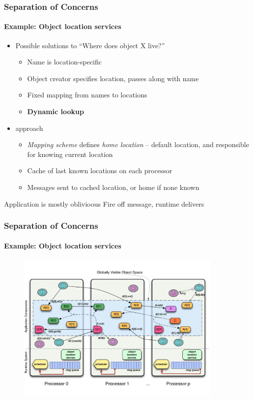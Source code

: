 \begin{frame}[t]
\frametitle{Separation of Concerns}
\framesubtitle{Example: Object location services}
\begin{itemize}[<+->]
\item Possible solutions to ``Where does object X live?''
\begin{itemize}[<+->]
\item Name is location-specific
\item Object creator specifies location, passes along with name
\item Fixed mapping from names to locations
\item \textbf{Dynamic lookup}
\end{itemize}
\item \charm approach
\begin{itemize}
\item \emph{Mapping scheme} defines \emph{home location} -- default location, and responsible for knowing current location
\item Cache of last known locations on each processor
\item Messages sent to cached location, or home if none known
\end{itemize}
\end{itemize}
\pause
\begin{block}{Application is mostly oblivioous}
Fire off message, runtime delivers
\end{block}
\end{frame}


\begin{frame}
\frametitle{Separation of Concerns}
\framesubtitle{Example: Object location services}
  \begin{figure}\includegraphics[width=0.9\textwidth]{../figures/progmodel/18-locmgr.pdf}\end{figure}
\end{frame}


